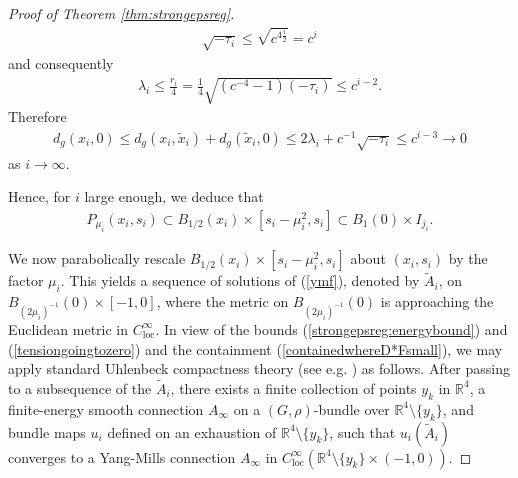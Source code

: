\documentclass[12pt]{amsart}
\renewcommand{\1}{{\mathbf 1}}
\newcommand{\R}{{\mathbb R}}
\theoremstyle{others}
\numberwithin{equation}{section}
\begin{document}
\begin{proof}[Proof of Theorem \ref{thm:strongepsreg}]
\begin{align*}
    \sqrt{-\tau_i} \leq \sqrt{c^{4\frac{i}{2}}} = c^i
\end{align*} and consequently
\begin{align*}
    \lambda_i \leq \frac{r_i}{4} = \frac{1}{4}\sqrt{(c^{-4}-1)(-\tau_i) } \leq c^{i-2}.
\end{align*} Therefore
\begin{align*}
    d_g(x_i, 0) \leq d_g(x_i, \tilde{x}_i) + d_g(\tilde{x}_i, 0) \leq 2\lambda_i + c^{-1}\sqrt{-\tau_i} 
    \leq c^{i-3} \to 0
\end{align*}
as $i \to \infty.$

Hence, for \(i\) large enough, we deduce that
\begin{align}\label{containedwhereD*Fsmall}
    P_{\mu_i}(x_i, s_i) \subset B_{1/2}(x_i) \times [s_i-\mu_i^2, s_i] \subset B_1(0) \times I_{j_i}.
\end{align}\par
 We now parabolically rescale \(B_{1/2}(x_i) \times [s_i-\mu_i^2, s_i]\) about \((x_i, s_i)\) by the factor \(\mu_i\). This yields a sequence of solutions of (\ref{ymf}), denoted by \(\tilde{A}_i\), on \(B_{(2\mu_i)^{-1}}(0) \times [-1, 0]\), where the metric on \(B_{(2\mu_i)^{-1}}(0)\) is approaching the Euclidean metric in \(C_\text{loc}^\infty\). In view of the bounds (\ref{strongepsreg:energybound}) and (\ref{tensiongoingtozero}) and the containment (\ref{containedwhereD*Fsmall}), we may apply standard Uhlenbeck compactness theory (see e.g. \cite[Theorem 1.3 and ]{waldronuhlenbeck}) as follows. After passing to a subsequence of the \(\tilde{A}_i\), there exists a finite collection of points \(y_k\) in \(\R^4\), a finite-energy smooth connection \(A_\infty\) on a \((G, \rho)\)-bundle over \(\R^4 \setminus \{y_k\}\),  and bundle maps \(u_i\) defined on an exhaustion of \(\R^4 \setminus \{y_k\}\), such that \(u_i(\tilde{A}_i)\) converges to a Yang-Mills connection \(A_\infty\) in \(C_{\text{loc}}^\infty(\R^4\setminus \{y_k\} \times (-1, 0))\). %
 

\end{proof}
\end{document}
